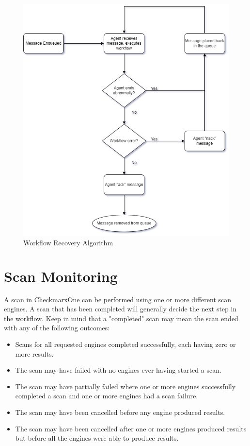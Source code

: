 \begin{figure}[h]
    \includegraphics[width=\textwidth]{graphics/cxoneflow-diagrams-Recovery Algorithm.png}
    \caption{Workflow Recovery Algorithm}
    \label{fig:recovery-flowchart}
\end{figure}



\section{Scan Monitoring}

A scan in CheckmarxOne can be performed using one or more different scan engines.
A scan that has been completed will generally decide the next step in the workflow.
Keep in mind that a "completed" scan may mean the scan ended with any of the
following outcomes:

\begin{itemize}
    \item Scans for all requested engines completed successfully, each having zero
    or more results.
    \item The scan may have failed with no engines ever having started a scan.
    \item The scan may have partially failed where one or more engines successfully
    completed a scan and one or more engines had a scan failure.
    \item The scan may have been cancelled before any engine produced results.
    \item The scan may have been cancelled after one or more engines produced
    results but before all the engines were able to produce results.
\end{itemize}

